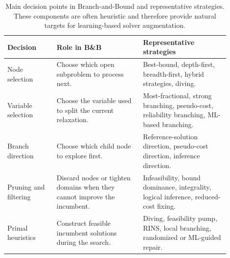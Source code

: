 \begin{table}[H]
    \centering
    \small
    \begin{tabular}{p{0.20\linewidth}p{0.35\linewidth}p{0.35\linewidth}}
        \toprule
        \textbf{Decision} & \textbf{Role in B\&B} & \textbf{Representative strategies} \\
        \midrule
        Node selection 
        & Choose which open subproblem to process next. 
        & Best-bound, depth-first, breadth-first, hybrid strategies, diving. \\
        \midrule
        Variable selection 
        & Choose the variable used to split the current relaxation. 
        & Most-fractional, strong branching, pseudo-cost, reliability branching, ML-based branching. \\
        \midrule
        Branch direction 
        & Choose which child node to explore first. 
        & Reference-solution direction, pseudo-cost direction, inference direction. \\
        \midrule
        Pruning and filtering 
        & Discard nodes or tighten domains when they cannot improve the incumbent. 
        & Infeasibility, bound dominance, integrality, logical inference, reduced-cost fixing. \\
        \midrule
        Primal heuristics 
        & Construct feasible incumbent solutions during the search. 
        & Diving, feasibility pump, RINS, local branching, randomized or ML-guided repair. \\
        \bottomrule
    \end{tabular}
    \caption{Main decision points in Branch-and-Bound and representative strategies. These components are often heuristic and therefore provide natural targets for learning-based solver augmentation.}
    \label{tab:branch_and_bound_strategies}
\end{table}